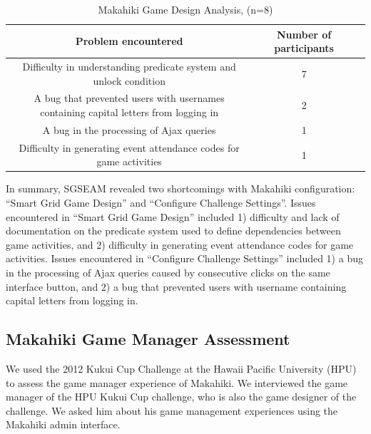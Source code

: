 \documentclass{sigchi}
\newcommand\tabhead[1]{\small\textbf{#1}}
\begin{document}
\begin{table}
  \centering
  \begin{tabular}{|c|c|c|}
    \hline
    \multicolumn{1}{|p{0.7\columnwidth}|}{\centering\tabhead{Problem encountered}} &
    \multicolumn{1}{|p{0.2\columnwidth}|}{\centering\tabhead{Number of participants}} \\
    \hline
    \multicolumn{1}{|p{0.7\columnwidth}|}{Difficulty in understanding predicate system and unlock condition} &
    \multicolumn{1}{|p{0.2\columnwidth}|}{7} \\
    \hline
    \multicolumn{1}{|p{0.7\columnwidth}|}{A bug that prevented users with usernames
containing capital letters from logging in} &
    \multicolumn{1}{|p{0.2\columnwidth}|}{2} \\
    \hline
    \multicolumn{1}{|p{0.7\columnwidth}|}{A bug in the processing of Ajax queries} &
    \multicolumn{1}{|p{0.2\columnwidth}|}{1} \\
    \hline
    \multicolumn{1}{|p{0.7\columnwidth}|}{Difficulty in generating event attendance codes for game activities} &
    \multicolumn{1}{|p{0.2\columnwidth}|}{1} \\
    \hline
  \end{tabular}
  \caption{Makahiki Game Design Analysis, (n=8)}
  \label{fig:makahiki-game-design}
\end{table}

In summary, SGSEAM revealed two shortcomings with Makahiki configuration: ``Smart
Grid Game Design'' and ``Configure Challenge Settings''. Issues encountered in ``Smart Grid Game
Design'' included 1) difficulty and lack of documentation on the predicate system used to define dependencies
between game activities, and 2) difficulty in generating event attendance codes for game activities.
Issues encountered in ``Configure Challenge Settings'' included 1) a bug in the processing of Ajax queries
caused by consecutive clicks on the same interface button, and 2) a bug that prevented users with username
containing capital letters from logging in.

\subsection{Makahiki Game Manager Assessment}

We used the 2012 Kukui Cup Challenge at the Hawaii Pacific University (HPU) to assess
the game manager experience of Makahiki. We interviewed the
game manager of the HPU Kukui Cup challenge, who is also the game designer of the challenge.
We asked him about his game management experiences using the Makahiki admin
interface.
\end{document}

